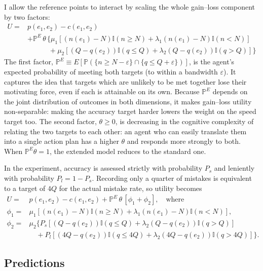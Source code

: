 \documentclass[12pt, letterpaper]{article}
\begin{document}
I allow the reference points to interact by scaling the whole gain--loss component by two factors:
\[
\begin{aligned}
U = {} & p(e_1, e_2) - c(e_1, e_2) \\
& + \mathbb{P}^E \, \theta \, \bigl\{ \mu_1[(n(e_1)-N)\mathbb{I}(n \geq N) + \lambda_1(n(e_1)-N)\mathbb{I}(n<N)] \\
& \qquad\quad + \mu_2[(Q-q(e_2))\mathbb{I}(q \leq Q) + \lambda_2(Q-q(e_2))\mathbb{I}(q>Q)] \bigr\}
\end{aligned}
\]
The first factor, $\mathbb{P}^E \equiv E[\mathbb{P}(\{n \geq N - \varepsilon \} \cap \{q \leq Q + \varepsilon\})]$, is the agent's expected probability of meeting both targets (to within a bandwidth $\varepsilon$). It captures the idea that targets which are unlikely to be met together lose their motivating force, even if each is attainable on its own. Because $\mathbb{P}^E$ depends on the joint distribution of outcomes in both dimensions, it makes gain--loss utility non-separable: making the accuracy target harder lowers the weight on the speed target too. The second factor, $\theta \geq 0$, is decreasing in the cognitive complexity of relating the two targets to each other: an agent who can easily translate them into a single action plan has a higher $\theta$ and responds more strongly to both. When $\mathbb{P}^E \theta = 1$, the extended model reduces to the standard one.

In the experiment, accuracy is assessed strictly with probability $P_s$ and leniently with probability $P_l = 1 - P_s$. Recording only a quarter of mistakes is equivalent to a target of $4Q$ for the actual mistake rate, so utility becomes
\[
\begin{aligned}
U = {} & p(e_1, e_2) - c(e_1, e_2) + \mathbb{P}^E \, \theta \, [\phi_1 + \phi_2], \quad \text{where} \\
\phi_1 = {} & \mu_1[(n(e_1)-N)\mathbb{I}(n \geq N) + \lambda_1(n(e_1)-N)\mathbb{I}(n<N)], \\
\phi_2 = {} & \mu_2 \bigl\{P_s[(Q-q(e_2))\mathbb{I}(q \leq Q) + \lambda_2(Q-q(e_2))\mathbb{I}(q>Q)] \\
& \quad + P_l[(4Q-q(e_2))\mathbb{I}(q \leq 4Q) + \lambda_2(4Q-q(e_2))\mathbb{I}(q>4Q)]\bigr\}.
\end{aligned}
\]

\subsection{Predictions}
\end{document}
